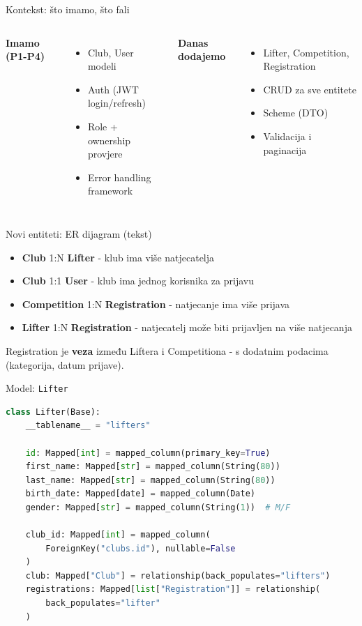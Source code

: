 \begin{frame}{Kontekst: što imamo, što fali}
\begin{columns}[T]
\textbf{Imamo (P1-P4)}
\begin{itemize}
  \item Club, User modeli
  \item Auth (JWT login/refresh)
  \item Role + ownership provjere
  \item Error handling framework
\end{itemize}

\textbf{Danas dodajemo}
\begin{itemize}
  \item Lifter, Competition, Registration
  \item CRUD za sve entitete
  \item Scheme (DTO)
  \item Validacija i paginacija
\end{itemize}
\end{columns}
\end{frame}

\begin{frame}{Novi entiteti: ER dijagram (tekst)}
\begin{itemize}
  \item \textbf{Club} 1:N \textbf{Lifter} - klub ima više natjecatelja
  \item \textbf{Club} 1:1 \textbf{User} - klub ima jednog korisnika za prijavu
  \item \textbf{Competition} 1:N \textbf{Registration} - natjecanje ima više prijava
  \item \textbf{Lifter} 1:N \textbf{Registration} - natjecatelj može biti prijavljen na više natjecanja
\end{itemize}

\vspace{0.6em}
Registration je \textbf{veza} između Liftera i Competitiona - s dodatnim podacima (kategorija, datum prijave).
\end{frame}

\begin{frame}[fragile, shrink=5]{Model: \texttt{Lifter}}
\begin{lstlisting}[language=python]
class Lifter(Base):
    __tablename__ = "lifters"

    id: Mapped[int] = mapped_column(primary_key=True)
    first_name: Mapped[str] = mapped_column(String(80))
    last_name: Mapped[str] = mapped_column(String(80))
    birth_date: Mapped[date] = mapped_column(Date)
    gender: Mapped[str] = mapped_column(String(1))  # M/F

    club_id: Mapped[int] = mapped_column(
        ForeignKey("clubs.id"), nullable=False
    )
    club: Mapped["Club"] = relationship(back_populates="lifters")
    registrations: Mapped[list["Registration"]] = relationship(
        back_populates="lifter"
    )
\end{lstlisting}
\end{frame}

